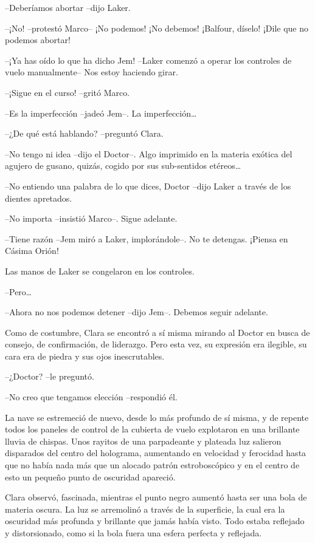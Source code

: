 {--Deberíamos abortar --dijo Laker.}

{--¡No! --protestó Marco-- ¡No podemos! ¡No debemos! ¡Balfour, díselo!
¡Dile que no podemos abortar!}

{--¡Ya has oído lo que ha dicho Jem! --Laker comenzó a operar los
controles de vuelo manualmente-- Nos estoy haciendo girar.}

{--¡Sigue en el curso! --gritó Marco.}

{--Es la imperfección --jadeó Jem--. La imperfección\ldots{}}

{--¿De qué está hablando? --preguntó Clara.}

{--No tengo ni idea --dijo el Doctor--. Algo imprimido en la materia
 exótica del agujero de gusano, quizás, cogido por sus sub-sentidos
 etéreos\ldots{}}

{--No entiendo una palabra de lo que dices, Doctor --dijo Laker a través
de los dientes apretados.}

{--No importa --insistió Marco--. Sigue adelante.}

{--Tiene razón --Jem miró a Laker, implorándole--. No te detengas.
¡Piensa en Cásima Orión!}

{Las manos de Laker se congelaron en los controles.}

{--Pero\ldots{}}

{--Ahora no nos podemos detener --dijo Jem--. Debemos seguir adelante.}

{Como de costumbre, Clara se encontró a sí misma mirando al Doctor en
 busca de consejo, de confirmación, de liderazgo. Pero esta vez, su
 expresión era ilegible, su cara era de piedra y sus ojos
inescrutables.}

{--¿Doctor? --le preguntó.}

{--No creo que tengamos elección --respondió él.}

{La nave se estremeció de nuevo, desde lo más profundo de sí misma, y de
 repente todos los paneles de control de la cubierta de vuelo explotaron
 en una brillante lluvia de chispas. Unos rayitos de una parpadeante y
 plateada luz salieron disparados del centro del holograma, aumentando en
 velocidad y ferocidad hasta que no había nada más que un alocado patrón
 estroboscópico y en el centro de esto un pequeño punto de oscuridad
apareció.}

{Clara observó, fascinada, mientras el punto negro aumentó hasta ser una
 bola de materia oscura. La luz se arremolinó a través de la superficie,
 la cual era la oscuridad más profunda y brillante que jamás había visto.
 Todo estaba reflejado y distorsionado, como si la bola fuera una esfera
perfecta y reflejada.}

